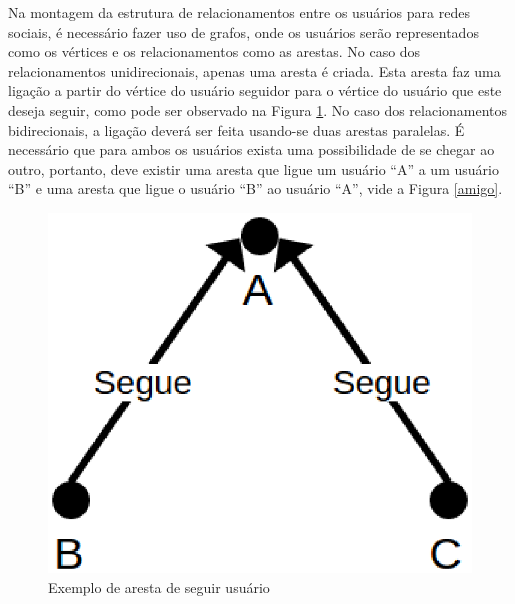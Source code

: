 Na montagem da estrutura de relacionamentos entre os usuários para redes sociais, é necessário fazer uso de grafos, onde os usuários serão representados como os vértices e os relacionamentos como as arestas. No caso dos relacionamentos unidirecionais, apenas uma aresta é criada. Esta aresta faz uma ligação a partir do vértice do usuário seguidor para o vértice do usuário que este deseja seguir, como pode ser observado na Figura \ref{segue}. No caso dos relacionamentos bidirecionais, a ligação deverá ser feita usando-se duas arestas paralelas. É necessário que para ambos os usuários exista uma possibilidade de se chegar ao outro, portanto, deve existir uma aresta que ligue um usuário ``A'' a um usuário ``B'' e uma aresta que ligue o usuário ``B'' ao usuário ``A'', vide a Figura \ref{amigo}.

\begin{figure}[!h]
	\centering
	\includegraphics[scale=0.45]{figuras/capitulo5/segue.eps}
	\caption{Exemplo de aresta de seguir usuário}
	\label{segue}
\end{figure}

